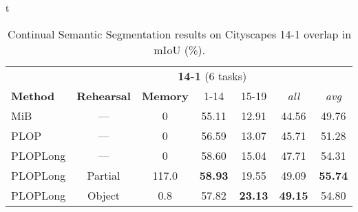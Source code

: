 t\begin{table}[t]
    \centering
    \begin{adjustbox}{max width=\textwidth}
        \begin{tabular}{@{}l|cc|cccc@{}}
            \toprule
                                                          & \multicolumn{6}{c}{\textbf{14-1} (6 tasks)}                                                                                       \\
            \textbf{Method}                               & \textbf{Rehearsal}                          & \textbf{Memory} & 1-14           & 15-19          & \textit{all}   & \textit{avg}   \\
            \midrule
            MiB \citep{cermelli2020modelingthebackground} & ---                                         & 0               & 55.11          & 12.91          & 44.56          & 49.76          \\
            PLOP                                          & ---                                         & 0               & 56.59          & 13.07          & 45.71          & 51.28          \\
            PLOPLong                                      & ---                                         & 0               & 58.60          & 15.04          & 47.71          & 54.31          \\
            PLOPLong                                      & Partial                                     & 117.0           & \textbf{58.93} & 19.55          & 49.09          & \textbf{55.74} \\
            PLOPLong                                      & Object                                      & 0.8             & 57.82          & \textbf{23.13} & \textbf{49.15} & 54.80          \\
            \bottomrule
        \end{tabular}
    \end{adjustbox}
    \caption{Continual Semantic Segmentation results on Cityscapes 14-1 overlap in \ac{mIoU} (\%).}
    \label{tab:seg_cityscapes_rehearsal}
\end{table}
